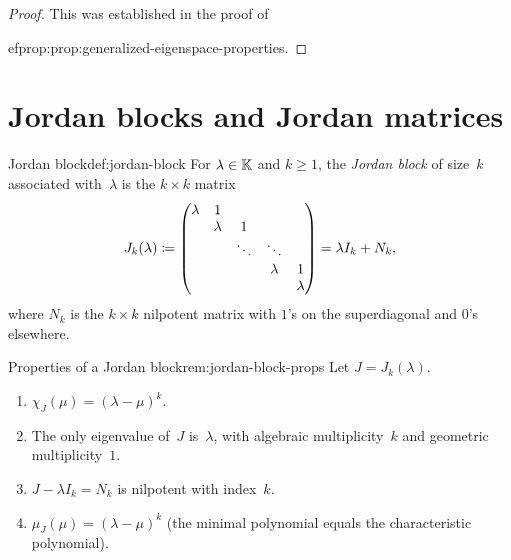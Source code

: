 \begin{proof}
This was established in the proof of

ef{prop:prop:generalized-eigenspace-properties}.
\end{proof}


\section{Jordan blocks and Jordan matrices}\label{sec:jordan-blocks}

\begin{definition}{Jordan block}{def:jordan-block}
For $\lambda \in {\mathbb{K}}$ and $k \geq 1$, the \emph{Jordan block} of
size~$k$ associated with~$\lambda$ is the $k \times k$ matrix
\[
  J_k(\lambda) \coloneqq
  \begin{pmatrix}
    \lambda & 1       &        &         \\
            & \lambda & 1      &         \\
            &         & \ddots & \ddots  \\
            &         &        & \lambda & 1 \\
            &         &        &         & \lambda
  \end{pmatrix}
  = \lambda I_k + N_k,
\]
where $N_k$ is the $k \times k$ nilpotent matrix with $1$'s on the
superdiagonal and $0$'s elsewhere.
\end{definition}

\begin{remark}{Properties of a Jordan block}{rem:jordan-block-props}
Let $J = J_k(\lambda)$.
\begin{enumerate}[label=(\roman*)]
  \item $\chi_J(\mu) = (\lambda - \mu)^k$.
  \item The only eigenvalue of~$J$ is~$\lambda$, with algebraic
    multiplicity~$k$ and geometric multiplicity~$1$.
  \item $J - \lambda I_k = N_k$ is nilpotent with index~$k$.
  \item $\mu_J(\mu) = (\lambda - \mu)^k$ (the minimal polynomial
    equals the characteristic polynomial).
\end{enumerate}
\end{remark}

